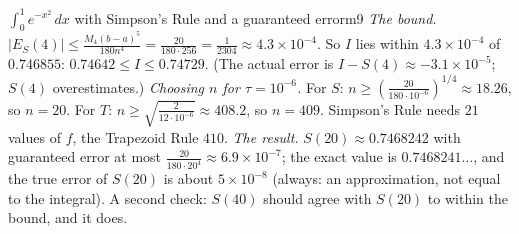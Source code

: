\documentclass[11pt]{article}
\begin{document}
\begin{exmp}{$\int_0^1e^{-x^2}\,dx$ with Simpson's Rule and a guaranteed error}{m9}
\emph{The bound.} $\lvert E_S(4)\rvert\le\frac{M_4(b-a)^5}{180n^4}=\frac{20}{180\cdot256}=\frac1{2304}\approx4.3\times10^{-4}$. So $I$ lies within $4.3\times10^{-4}$ of $0.746855$: $0.74642\le I\le0.74729$. (The actual error is $I-S(4)\approx-3.1\times10^{-5}$; $S(4)$ overestimates.)
\emph{Choosing $n$ for $\tau=10^{-6}$.} For $S$: $n\ge\left(\frac{20}{180\cdot10^{-6}}\right)^{1/4}\approx18.26$, so $n=20$. For $T$: $n\ge\sqrt{\frac{2}{12\cdot10^{-6}}}\approx408.2$, so $n=409$. Simpson's Rule needs $21$ values of $f$, the Trapezoid Rule $410$.
\emph{The result.} $S(20)\approx0.7468242$ with guaranteed error at most $\frac{20}{180\cdot20^4}\approx6.9\times10^{-7}$; the exact value is $0.7468241\ldots$, and the true error of $S(20)$ is about $5\times10^{-8}$ (always: an approximation, not equal to the integral). A second check: $S(40)$ should agree with $S(20)$ to within the bound, and it does.
\end{exmp}
\end{document}
